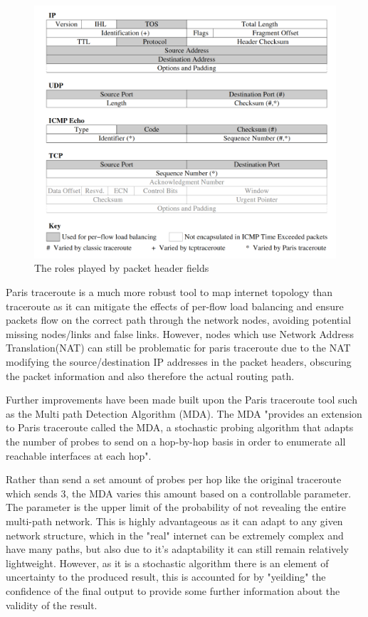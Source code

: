 \begin{figure}[!ht]
  \begin{center}
    \includegraphics[scale=0.3]{images/packet_header.png}
    \caption{The roles played by packet header fields \cite{anomalies}}
    \label{figure:packet_header_fig}
  \end{center}
\end{figure}

Paris traceroute is a much more robust tool to map internet topology than traceroute as it can mitigate the effects of per-flow load balancing and ensure packets flow on the correct path through the network nodes, avoiding potential missing nodes/links and false links. However, nodes which use Network Address Translation(NAT) can still be problematic for paris traceroute due to the NAT modifying the source/destination IP addresses in the packet headers, obscuring the packet information and also therefore the actual routing path. \cite{anomalies}

Further improvements have been made built upon the Paris traceroute tool such as the Multi path Detection Algorithm (MDA). The MDA "provides an extension to Paris traceroute called the MDA, a stochastic probing algorithm that adapts the number of
probes to send on a hop-by-hop basis in order to enumerate all reachable interfaces at each hop". \cite{MDA2}

Rather than send a set amount of probes per hop like the original traceroute which sends 3, the MDA varies this amount based on a controllable parameter. \cite{MDA2} The parameter is the upper limit of the probability of not revealing the entire multi-path network. This is highly advantageous as it can adapt to any given network structure, which in the "real" internet can be extremely complex and have many paths, but also due to it's adaptability it can still remain relatively lightweight. However, as it is a stochastic algorithm there is an element of uncertainty to the produced result, this is accounted for by "yeilding" the  confidence of the final output to provide some further information about the validity of the result. \cite{MDA-lite}\cite{diamond-miner}\cite{MDA3}


